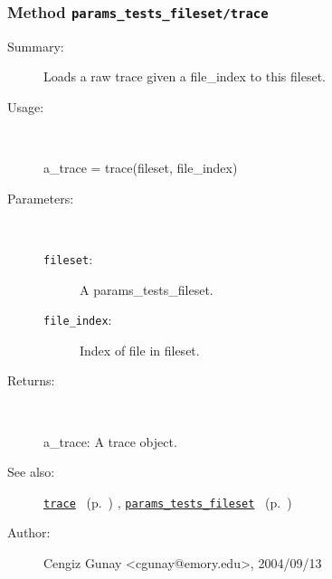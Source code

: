 \subsubsection[Method \texttt{trace}]{Method \texttt{params\_tests\_fileset/trace}}%
%
\label{ref_params_tests_fileset__trace}%
\hypertarget{ref_params_tests_fileset__trace}{}%
\begin{description}
\item[Summary:]Loads a raw trace given a file\_index to this fileset.
%
\item[Usage:]~%
\begin{lyxcode}%
a\_trace = trace(fileset, file\_index)
%
\end{lyxcode}%
%
%
\item[Parameters:]~
\begin{description}%
\item[\texttt{fileset}:]
 A params\_tests\_fileset.
\item[\texttt{file\_index}:]
 Index of file in fileset.
\end{description}%
%
\item[Returns:
]~

	a\_trace: A trace object.
%
%
\item[See also:]%
\hyperlink{ref_trace}{\texttt{trace}}%
\ (p.~\pageref{ref_trace})%
%
, \hyperlink{ref_params_tests_fileset}{\texttt{params\_tests\_fileset}}%
\ (p.~\pageref{ref_params_tests_fileset})%
%
%
\item[Author:]%
Cengiz Gunay <cgunay@emory.edu>, 2004/09/13
%
\end{description}
\methodline%
